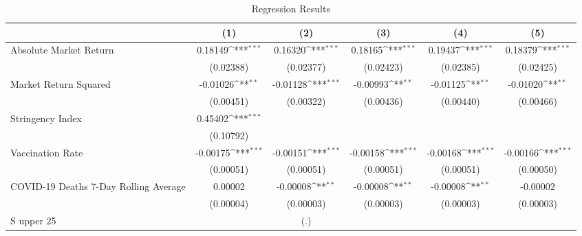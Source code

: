 \begin{table}[htbp]\centering
\def\sym#1{\ifmmode^{#1}\else\(^{#1}\)\fi}
\caption{Regression Results \label{reg1}}
\begin{tabular}{l*{5}{c}}
\toprule
                    &\multicolumn{1}{c}{(1)}         &\multicolumn{1}{c}{(2)}         &\multicolumn{1}{c}{(3)}         &\multicolumn{1}{c}{(4)}         &\multicolumn{1}{c}{(5)}         \\
\midrule
Absolute Market Return&     0.18149\sym{***}&     0.16320\sym{***}&     0.18165\sym{***}&     0.19437\sym{***}&     0.18379\sym{***}\\
                    &   (0.02388)         &   (0.02377)         &   (0.02423)         &   (0.02385)         &   (0.02425)         \\
\addlinespace
Market Return Squared&    -0.01026\sym{**} &    -0.01128\sym{***}&    -0.00993\sym{**} &    -0.01125\sym{**} &    -0.01020\sym{**} \\
                    &   (0.00451)         &   (0.00322)         &   (0.00436)         &   (0.00440)         &   (0.00466)         \\
\addlinespace
Stringency Index    &     0.45402\sym{***}&                     &                     &                     &                     \\
                    &   (0.10792)         &                     &                     &                     &                     \\
\addlinespace
Vaccination Rate    &    -0.00175\sym{***}&    -0.00151\sym{***}&    -0.00158\sym{***}&    -0.00168\sym{***}&    -0.00166\sym{***}\\
                    &   (0.00051)         &   (0.00051)         &   (0.00051)         &   (0.00051)         &   (0.00050)         \\
\addlinespace
COVID-19 Deaths 7-Day Rolling Average&     0.00002         &    -0.00008\sym{**} &    -0.00008\sym{**} &    -0.00008\sym{**} &    -0.00002         \\
                    &   (0.00004)         &   (0.00003)         &   (0.00003)         &   (0.00003)         &   (0.00003)         \\
\addlinespace
S upper 25%
                    &                     &         (.)         &                     &                     &                     \\

\end{tabular}
\end{table}
